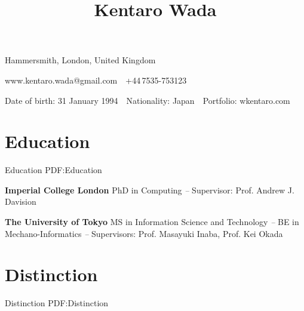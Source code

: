 \documentclass[letterpaper,MMMyyyy,nonstop]{simpleresumecv}
\newcommand{\CVAuthor}{Kentaro Wada}
\newcommand{\CVWebpage}{wkentaro.com}
\begin{document}

\title{\CVAuthor}

\begin{subtitle}
Hammersmith, London, United Kingdom
\par
www.kentaro.wada@gmail.com
\,\SubBulletSymbol\,
+44\,7535-753123
\par
Date of birth: 31 January 1994
\,\SubBulletSymbol\,
Nationality: Japan
\,\SubBulletSymbol\,
Portfolio: \CVWebpage

\noindent\makebox[\linewidth]{\rule{0.8\paperwidth}{0.4pt}}
\end{subtitle}

\begin{body}


\section
{Education}
{Education}
{PDF:Education}

\textbf{Imperial College London}
\newline
PhD in Computing
\hfill
{\it {} -- }
\newline
Supervisor: Prof. Andrew J. Davision

\GapNoBreak

\textbf{The University of Tokyo}
\newline
MS in Information Science and Technology
\hfill
{\it {} -- }
\newline
BE in Mechano-Informatics
\hfill
{\it {} -- }
\newline
Supervisors: Prof. Masayuki Inaba, Prof. Kei Okada


%


\section
{Distinction}
{Distinction}
{PDF:Distinction}


\end{body}
\end{document}

